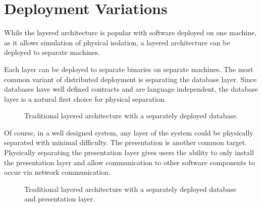 \section{Deployment Variations}

While the layered architecture is popular with software deployed on one machine, as it allows simulation of physical isolation,
a layered architecture can be deployed to separate machines.

Each layer can be deployed to separate binaries on separate machines.
The most common variant of distributed deployment is separating the database layer.
Since databases have well defined contracts and are language independent, the database layer is a natural first choice for physical separation.

\begin{figure}[ht]
    \centering
    \caption{Traditional layered architecture with a separately deployed database.}
    \label{fig:layered-db-separated}
\end{figure}

Of course, in a well designed system, any layer of the system could be physically separated with minimal difficulty.
The presentation is another common target.
Physically separating the presentation layer gives users the ability to only install the presentation layer and allow communication to
other software components to occur via network communication.

\begin{figure}[ht]
    \centering
    \caption{Traditional layered architecture with a separately deployed database and presentation layer.}
    \label{fig:layered-db-pres-separated}
\end{figure}

